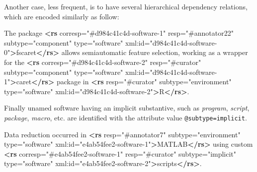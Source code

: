 \documentclass[
]{article}
\newenvironment{Shaded}{}{}
\newcommand{\KeywordTok}[1]{\textcolor[rgb]{0.00,0.44,0.13}{\textbf{#1}}}
\newcommand{\NormalTok}[1]{#1}
\newcommand{\OtherTok}[1]{\textcolor[rgb]{0.00,0.44,0.13}{#1}}
\newcommand{\StringTok}[1]{\textcolor[rgb]{0.25,0.44,0.63}{#1}}
\begin{document}
Another case, less frequent, is to have several hierarchical dependency
relations, which are encoded similarly as follow:

\begin{Shaded}
\begin{Highlighting}[]
\NormalTok{The package }\KeywordTok{\textless{}rs}\OtherTok{ corresp=}\StringTok{"\#d984c41c4d{-}software{-}1"}\OtherTok{ resp=}\StringTok{"\#annotator22"} 
\OtherTok{subtype=}\StringTok{"component"}\OtherTok{ type=}\StringTok{"software"}\OtherTok{ xml:id=}\StringTok{"d984c41c4d{-}software{-}0"}\KeywordTok{\textgreater{}}\NormalTok{fscaret}\KeywordTok{\textless{}/rs\textgreater{}} 
\NormalTok{allows semiautomatic feature selection, working as a wrapper for the }
\KeywordTok{\textless{}rs}\OtherTok{ corresp=}\StringTok{"\#d984c41c4d{-}software{-}2"}\OtherTok{ resp=}\StringTok{"\#curator"}\OtherTok{ subtype=}\StringTok{"component"} 
\OtherTok{  type=}\StringTok{"software"}\OtherTok{ xml:id=}\StringTok{"d984c41c4d{-}software{-}1"}\KeywordTok{\textgreater{}}\NormalTok{caret}\KeywordTok{\textless{}/rs\textgreater{}}\NormalTok{ package in }
\KeywordTok{\textless{}rs}\OtherTok{ resp=}\StringTok{"\#curator"}\OtherTok{ subtype=}\StringTok{"environment"}\OtherTok{ type=}\StringTok{"software"} 
\OtherTok{    xml:id=}\StringTok{"d984c41c4d{-}software{-}2"}\KeywordTok{\textgreater{}}\NormalTok{R}\KeywordTok{\textless{}/rs\textgreater{}}\NormalTok{.}
\end{Highlighting}
\end{Shaded}

Finally unamed software having an implicit substantive, such as
\emph{program}, \emph{script}, \emph{package}, \emph{macro}, etc. are
identified with the attribute value \texttt{@subtype=implicit}.

\begin{Shaded}
\begin{Highlighting}[]
\NormalTok{Data reduction occurred in }\KeywordTok{\textless{}rs}\OtherTok{ resp=}\StringTok{"\#annotator7"}\OtherTok{ subtype=}\StringTok{"environment"} 
\OtherTok{type=}\StringTok{"software"}\OtherTok{ xml:id=}\StringTok{"e4ab54fee2{-}software{-}1"}\KeywordTok{\textgreater{}}\NormalTok{MATLAB}\KeywordTok{\textless{}/rs\textgreater{}}\NormalTok{ using custom }
\KeywordTok{\textless{}rs}\OtherTok{ corresp=}\StringTok{"\#e4ab54fee2{-}software{-}1"}\OtherTok{ resp=}\StringTok{"\#curator"}\OtherTok{ subtype=}\StringTok{"implicit"} 
\OtherTok{  type=}\StringTok{"software"}\OtherTok{ xml:id=}\StringTok{"e4ab54fee2{-}software{-}2"}\KeywordTok{\textgreater{}}\NormalTok{scripts}\KeywordTok{\textless{}/rs\textgreater{}}\NormalTok{.}
\end{Highlighting}
\end{Shaded}
\end{document}
